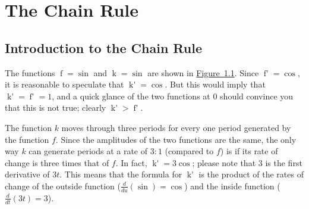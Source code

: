 \documentclass[12pt,]{book}
\theoremstyle{plain}
\theoremstyle{definition}
\numberwithin{equation}{section}
\newcommand{\fe}[2]{\mathop{{#1}{\left(#2\right)}}}
\newcommand{\fd}[1]{#1'}
\newcommand{\lzoo}[2]{{\frac{d}{d#1}}{\left(#2\right)}}
\begin{document}
\chapter[The Chain Rule]{The Chain Rule}\label{chapter-chain-rule}
\typeout{************************************************}
\typeout{************************************************}
\section[Introduction to the Chain Rule]{Introduction to the Chain Rule}\label{section-introduction-to-the-chain-rule}
The functions \(\fe{f}{t}=\fe{\sin}{t}\) and \(\fe{k}{t}=\fe{\sin}{3t}\) are shown in \hyperref[figure-sine-waves]{Figure~\ref*{figure-sine-waves}}. Since \(\fe{\fd{f}}{t}=\fe{\cos}{t}\), it is reasonable to speculate that \(\fe{\fd{k}}{t}=\fe{\cos}{3t}\).  But this would imply that \(\fe{\fd{k}}{0}=\fe{\fd{f}}{0}=1\), and a quick glance of the two functions at \(0\) should convince you that this is not true; clearly \(\fe{\fd{k}}{0}>\fe{\fd{f}}{0}\).%
\begin{figure}
\centering
{
}
\caption{\label{figure-sine-waves}}
\end{figure}
\par
The function \(k\) moves through three periods for every one period generated by the function \(f\).  Since the amplitudes of the two functions are the same, the only way \(k\) can generate periods at a rate of \(3:1\) (compared to \(f\)) is if its rate of change is three times that of \(f\).  In fact, \(\fe{\fd{k}}{t}=3\fe{\cos}{3t}\); please note that \(3\) is the first derivative of \(3t\).  This means that the formula for \(\fe{\fd{k}}{t}\) is the product of the rates of change of the outside function (\(\lzoo{u}{\fe{\sin}{u}}=\fe{\cos}{u}\)) and the inside function (\(\lzoo{t}{3t}=3\)).%
\par
\end{document}
